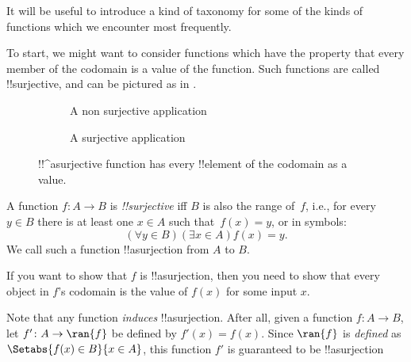 \documentclass[../../../include/open-logic-section]{subfiles}
\begin{document}

\begin{explain}
It will be useful to introduce a kind of taxonomy for some of the
kinds of functions which we encounter most frequently.


To start, we might want to consider functions which have the property
that every member of the codomain is a value of the function. Such
functions are called !!{surjective}, and can be pictured as in
.

\begin{figure}
  \centering
  \begin{subfigure}{0.49\linewidth}
  	\centering
  	\caption{A non surjective application}
  \end{subfigure}
  \begin{subfigure}{0.49\linewidth}
  	\centering
  	\caption{A surjective application}
  \end{subfigure}
  \caption{!!^a{surjective} function has every !!{element} of the
    codomain as a value.}
\end{figure}
\end{explain}

\begin{defn}
A function $f \colon A \rightarrow B$ is \emph{!!{surjective}} iff $B$
is also the range of~$f$, i.e., for every $y \in B$ there is at least
one $x \in A$ such that~$f(x) = y$, or in symbols:
\[
  (\forall y \in B)(\exists x \in A)f(x) = y.
\]
We call such a function !!a{surjection} from $A$ to $B$.
\end{defn}

\begin{explain}
If you want to show that $f$ is !!a{surjection}, then you need to show
that every object in $f$'s codomain is the value of $f(x)$ for some
input $x$.

Note that any function \emph{induces} !!a{surjection}. After all,
given a function $f \colon A \to B$, let $f' \colon A \to \ran{f}$ be
defined by $f'(x) = f(x)$. Since $\ran{f}$ is \emph{defined} as
$\Setabs{f(x) \in B}{x \in A}$, this function $f'$ is guaranteed to be
!!a{surjection}
\end{explain}
\end{document}
